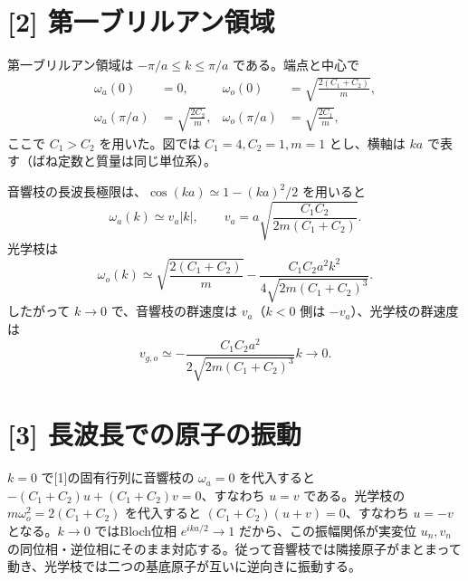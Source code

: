 \documentclass[11pt,a4paper]{article}
\begin{document}
\section*{[2] 第一ブリルアン領域}
第一ブリルアン領域は $-\pi/a\le k\le\pi/a$ である。端点と中心で
\begin{align}
 \omega_a(0)&=0,&
 \omega_o(0)&=\sqrt{\frac{2(C_1+C_2)}{m}},\\
 \omega_a(\pi/a)&=\sqrt{\frac{2C_2}{m}},&
 \omega_o(\pi/a)&=\sqrt{\frac{2C_1}{m}},
\end{align}
ここで $C_1>C_2$ を用いた。図では $C_1=4,C_2=1,m=1$ とし、横軸は $ka$ で表す（ばね定数と質量は同じ単位系）。
\begin{center}
\end{center}
音響枝の長波長極限は、$\cos(ka)\simeq1-(ka)^2/2$ を用いると
\begin{equation}
 \omega_a(k)\simeq v_a|k|,\qquad
 \boxed{v_a=a\sqrt{\frac{C_1C_2}{2m(C_1+C_2)}}}.
\end{equation}
光学枝は
\begin{equation}
 \omega_o(k)\simeq\sqrt{\frac{2(C_1+C_2)}{m}}
 -\frac{C_1C_2a^2k^2}{4\sqrt{2m(C_1+C_2)^3}}.
\end{equation}
したがって $k\to0$ で、音響枝の群速度は $v_a$（$k<0$ 側は $-v_a$）、光学枝の群速度は
\begin{equation}
 v_{g,o}\simeq-\frac{C_1C_2a^2}{2\sqrt{2m(C_1+C_2)^3}}k\longrightarrow0.
\end{equation}

\section*{[3] 長波長での原子の振動}
$k=0$ で[1]の固有行列に音響枝の $\omega_a=0$ を代入すると $-(C_1+C_2)u+(C_1+C_2)v=0$、すなわち $u=v$ である。光学枝の $m\omega_o^2=2(C_1+C_2)$ を代入すると $(C_1+C_2)(u+v)=0$、すなわち $u=-v$ となる。$k\to0$ ではBloch位相 $e^{ika/2}\to1$ だから、この振幅関係が実変位 $u_n,v_n$ の同位相・逆位相にそのまま対応する。従って音響枝では隣接原子がまとまって動き、光学枝では二つの基底原子が互いに逆向きに振動する。
\end{document}
